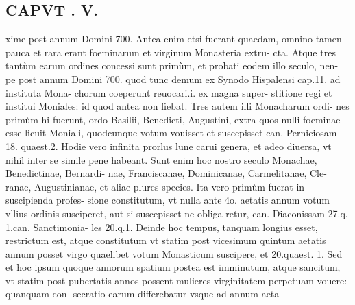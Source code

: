 \documentclass{article}
\begin{document}
\begin{pages}
\section*{CAPVT . V. }
\marginpar{[ p.293 ]}\pstart xime post annum Domini 700. Antea enim etsi fuerant quaedam, omnino tamen pauca et rara erant foeminarum et virginum Monasteria extru- cta. Atque tres tantùm earum ordines concessi sunt primùm, et probati eodem illo seculo, nen- pe post annum Domini 700. quod tunc demum ex Synodo Hispalensi cap.11. ad instituta Mona- chorum coeperunt reuocari.i. ex magna super- stitione regi et institui Moniales: id quod antea non fiebat. Tres autem illi Monacharum ordi- nes primùm hi fuerunt, ordo Basilii, Benedicti, Augustini, extra quos nulli foeminae esse licuit Moniali, quodcunque  votum vouisset et suscepisset can. Perniciosam 18. quaest.2. Hodie vero infinita prorlus lune carui genera, et adeo diuersa, vt nihil inter se simile pene habeant. Sunt enim hoc nostro seculo Monachae, Benedictinae, Bernardi- nae, Franciscanae, Dominicanae, Carmelitanae, Cle- ranae, Augustinianae, et aliae plures species.  \pend\pstart Ita vero primùm fuerat in suscipienda profes- sione constitutum, vt nulla ante 4o. aetatis annum votum vllius ordinis susciperet, aut si suscepisset ne obliga retur, can. Diaconissam 27.q. 1.can. Sanctimonia- les 20.q.1. Deinde hoc tempus, tanquam longius esset, restrictum est, atque constitutum vt statim post vicesimum quintum aetatis annum posset virgo quaelibet votum Monasticum suscipere, et 20.quaest. 1. Sed et hoc ipsum quoque annorum spatium postea est imminutum, atque sancitum, vt statim post pubertatis annos possent mulieres virginitatem perpetuam vouere: quanquam con- secratio earum differebatur vsque  ad annum aeta-  \pend

\end{pages}
\end{document}
